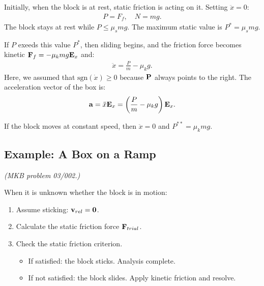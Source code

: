 \documentclass[
  letterpaper,
  DIV=11,
  numbers=noendperiod]{scrreprt}
\providecommand{\tightlist}{%
  \setlength{\itemsep}{0pt}\setlength{\parskip}{0pt}}
\newcommand{\lp}{\left(}
\newcommand{\rp}{\right)}
\begin{document}
Initially, when the block is at rest, static friction is acting on it.
Setting \(\ddot{x}=0\): \begin{align}
    P = F_f, \quad N = mg.
\end{align} The block stays at rest while \(P \leq \mu_s mg\). The
maximum static value is \(P^* = \mu_s mg\).

If \(P\) exeeds this value \(P^*\), then sliding begins, and the
friction force becomes kinetic \({\bf F}_f = -\mu_k mg{\bf E}_x\) and:
\begin{align}
    \ddot{x} = \frac{P}{m}-\mu_k g.
\end{align} Here, we assumed that \(\text{sgn}(\dot{x})\geq 0\) because
\({\bf P}\) always points to the right. The acceleration vector of the
box is: \begin{align}
    {\bf a} = \ddot{x}{\bf E}_x = \lp\frac{P}{m}-\mu_k g\rp{\bf E}_x.
\end{align}

If the block moves at constant speed, then \(\ddot{x}=0\) and
\(P^{**} = \mu_k mg\).

\subsection{Example: A Box on a Ramp}\label{example-a-box-on-a-ramp}

\emph{(MKB problem 03/002.)}

When it is unknown whether the block is in motion:

\begin{enumerate}
\def\labelenumi{\arabic{enumi}.}
\tightlist
\item
  Assume sticking: \({\bf v}_{rel} = {\bf 0}\).
\item
  Calculate the static friction force \({\bf F}_{trial}\).
\item
  Check the static friction criterion.

  \begin{itemize}
  \tightlist
  \item
    If satisfied: the block sticks. Analysis complete.
  \item
    If not satisfied: the block slides. Apply kinetic friction and
    resolve.
  \end{itemize}
\end{enumerate}
\end{document}
